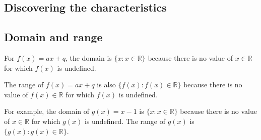 \subsection*{Discovering the characteristics} 
\label{m39338*uid83}
\subsection*{ Domain and range}
\nopagebreak
\label{m39338*id238381}For $f\left(x\right)=ax+q$, the domain is $\{x:x\in \mathbb{R}\}$ because there is no value of $x\in \mathbb{R}$ for which $f\left(x\right)$ is undefined.\par 
\label{m39338*id238474}The range of $f\left(x\right)=ax+q$ is also $\{f\left(x\right):f\left(x\right)\in \mathbb{R}\}$ because there is no value of $f\left(x\right)\in \mathbb{R}$ for which $f\left(x\right)$ is undefined.\par 
\label{m39338*id238584}For example, the domain of $g\left(x\right)=x-1$ is $\{x:x\in \mathbb{R}\}$ because there is no value of $x\in \mathbb{R}$ for which $g\left(x\right)$ is undefined. The range of $g\left(x\right)$ is $\{g\left(x\right):g\left(x\right)\in \mathbb{R}\}$.\par 
\label{m39338*uid84}
